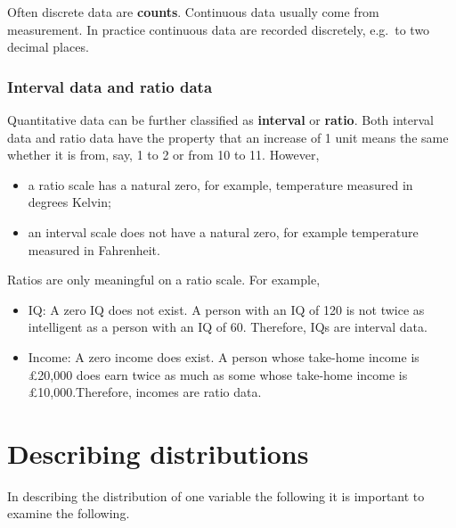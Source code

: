 \documentclass[
  british,
]{book}
\providecommand{\tightlist}{%
  \setlength{\itemsep}{0pt}\setlength{\parskip}{0pt}}
\begin{document}
Often discrete data are \textbf{counts}. Continuous data usually come from measurement. In practice continuous data are recorded discretely, e.g.~to two decimal places.

\hypertarget{interval-data-and-ratio-data}{%
\subsubsection*{Interval data and ratio data}\label{interval-data-and-ratio-data}}

Quantitative data can be further classified as \textbf{interval} or \textbf{ratio}. Both interval data and ratio data have the property that an increase of 1 unit means the same whether it is from, say, 1 to 2 or from 10 to 11. However,

\begin{itemize}
\tightlist
\item
  a ratio scale has a natural zero, for example, temperature measured in degrees Kelvin;
\item
  an interval scale does not have a natural zero, for example temperature
  measured in Fahrenheit.
\end{itemize}

Ratios are only meaningful on a ratio scale. For example,

\begin{itemize}
\tightlist
\item
  IQ: A zero IQ does not exist. A person with an IQ of 120 is not twice as intelligent as a person with an IQ of 60. Therefore, IQs are interval data.
\item
  Income: A zero income does exist. A person whose take-home income is \pounds 20,000 does earn twice as much as some whose take-home income is \pounds 10,000.Therefore, incomes are ratio data.
\end{itemize}

\hypertarget{describing-distributions}{%
\section{Describing distributions}\label{describing-distributions}}

In describing the distribution of one variable the following it is important to
examine the following.
\end{document}
